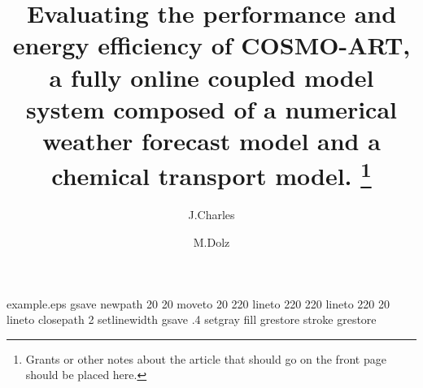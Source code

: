 %
%
%
%
\begin{filecontents*}{example.eps}
gsave
newpath
  20 20 moveto
  20 220 lineto
  220 220 lineto
  220 20 lineto
closepath
2 setlinewidth
gsave
  .4 setgray fill
grestore
stroke
grestore
\end{filecontents*}
%
\RequirePackage{fix-cm}
%
\documentclass[twocolumn]{svjour3}           %
%
\smartqed %
%
\usepackage{graphicx}
\usepackage{hyperref}
\usepackage[round, sort, numbers, authoryear]{natbib}
%
%
%


\title{Evaluating the performance  and energy efficiency of COSMO-ART,
  a fully online coupled model  system composed of a numerical weather
  forecast model  and a  chemical transport model.   \thanks{Grants or
    other notes  about the  article that should  go on the  front page
    should be placed here.}}


\author{J.Charles \and M.Dolz}




